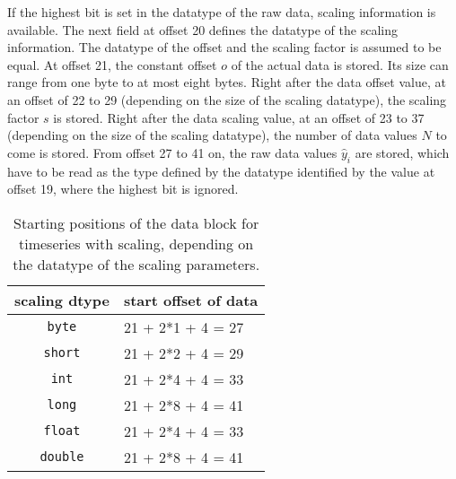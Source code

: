 \documentclass[a4paper,10pt]{article}
\begin{document}
If the highest bit is set in the datatype of the raw data, scaling information is available.
The next field at offset 20 defines the datatype of the scaling information.
The datatype of the offset and the scaling factor is assumed to be equal.
At offset 21, the constant offset $o$ of the actual data is stored. Its size can range from one byte to at most eight bytes.
Right after the data offset value, at an offset of 22 to 29 (depending on the size of the scaling datatype), the scaling factor $s$ is stored.
Right after the data scaling value, at an offset of 23 to 37 (depending on the size of the scaling datatype), the number of data values $N$ to come is stored.
From offset 27 to 41 on, the raw data values $\hat{y}_i$ are stored, which have to be read as the type defined by the datatype
identified by the value at offset 19, where the highest bit is ignored.

\begin{table}[htbp]
 \centering
 \begin{tabular}{|c|l|}
    \hline
    scaling dtype   & start offset of data \\
    \hline                              
    \texttt{byte}   & 21 + 2*1 + 4 = 27 \\
    \hline
    \texttt{short}  & 21 + 2*2 + 4 = 29 \\
     \hline
    \texttt{int}    & 21 + 2*4 + 4 = 33 \\
     \hline
    \texttt{long}   & 21 + 2*8 + 4 = 41 \\
     \hline
    \texttt{float}  & 21 + 2*4 + 4 = 33 \\
     \hline
    \texttt{double} & 21 + 2*8 + 4 = 41 \\
    \hline
 \end{tabular}
 \caption{Starting positions of the data block for timeseries with scaling, depending on the datatype of the scaling parameters.}
 \label{tab:starts_data}
\end{table}
\end{document}
